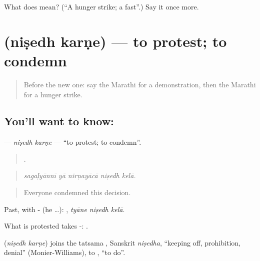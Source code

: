 \begin{tcolorbox}[breakable,colback=teal!4,colframe=teal!35!black,title={Before you move on}]
What does  mean? (\textquotedblleft{}A hunger strike; a fast\textquotedblright{}.) Say it once more.
\end{tcolorbox}
\section[\texorpdfstring{\mr{निषेध} \mr{करणे} (niṣedh karṇe)}{निषेध करणे (niṣedh karṇe)}]{  (niṣedh karṇe) — to protest; to condemn}

\label{lesson:MR-C362-nisedh-karne}



\begin{quote}
Before the new one: say the Marathi for a demonstration, then the Marathi for a hunger strike.
\end{quote}

\subsection*{You'll want to know:  }
\textbf{ } — \emph{niṣedh karṇe} — \textquotedblleft{}to protest; to condemn\textquotedblright{}.

\begin{quote}
    .
\end{quote}

\begin{quote}
\emph{sagaḷyānnī yā nirṇayācā niṣedh kelā.}
\end{quote}

\begin{quote}
Everyone condemned this decision.
\end{quote}

Past, with - (he …):   , \emph{tyāne niṣedh kelā}.

What is protested takes -:  .

\begin{cousinweb}
\textbf{ } (\emph{niṣedh karṇe}) joins the tatsama , Sanskrit \emph{niṣedha}, \textquotedblleft{}keeping off, prohibition, denial\textquotedblright{} (Monier-Williams), to , \textquotedblleft{}to do\textquotedblright{}.
\end{cousinweb}

